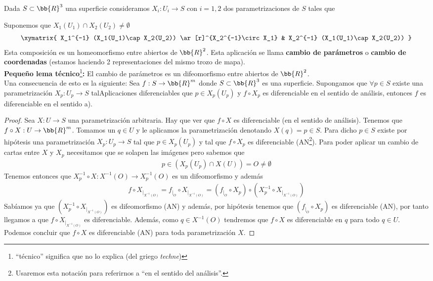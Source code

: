 \begin{ejemplo}
\begin{enumerate}
        Dada $S\subset \bb{R}^3$ una superficie consideramos $X_i:U_i\to S$ con $i=1,2$ dos parametrizaciones de $S$ tales que 

        Suponemos que $X_1(U_1)\cap X_2(U_2) \neq \emptyset$
        \begin{gather*}
            \xymatrix{
                X_1^{-1} (X_1(U_1)\cap X_2(U_2)) \ar[r]^{X_2^{-1}\circ X_1} & X_2^{-1} (X_1(U_1)\cap X_2(U_2))
            }
        \end{gather*}
        Esta composición es un homeomorfismo entre abiertos de $\bb{R}^2$. Esta aplicación se llama \textbf{cambio de parámetros} o \textbf{cambio de coordenadas} (estamos haciendo 2 representaciones del mismo trozo de mapa). \\

        \textbf{Pequeño lema técnico}\footnote{``técnico'' significa que no lo explica (del griego \textit{techne})}\textbf{:} El cambio de parámetros es un difeomorfismo entre abiertos de $\bb{R}^2$.\\

        Una consecuencia de esto es la siguiente: Sea $f:S\to \bb{R}^m$ donde $S \subset \bb{R}^3$ es una superficie. Supongamos que $\forall p \in S$ existe una parametrización $X_p:U_p\to S$ talAplicaciones diferenciables que $p\in X_p(U_p)$ y $f\circ X_p$ es diferenciable en el sentido de análisis, entonces $f$ es diferenciable en el sentido a).
        \begin{proof}
            Sea $X:U\to S$ una parametrización arbitraria. Hay que ver que $f\circ X$ es diferenciable (en el sentido de análisis). Tenemos que $f\circ X : U \to \bb{R}^m$. Tomamos un $q\in U$ y le aplicamos la parametrización denotando $X(q)=p\in S$. Para dicho $p\in S$ existe por hipótesis una parametrización $X_p:U_p\to S$ tal que $p\in X_p(U_p)$ y tal que $f\circ X_p$ es diferenciable (AN\footnote{Usaremos esta notación para referirnos a ``en el sentido del análisis''.}). Para poder aplicar un cambio de cartas entre $X$ y $X_p$ necesitamos que se solapen las imágenes pero sabemos que 
            \begin{gather*}
                p\in (X_p(U_p)\cap X(U))=O \neq \emptyset
            \end{gather*}
            Tenemos entonces que $X_p^{-1}\circ X: X^{-1}(O)\to X_p^{-1}(O)$ es un difeomorfismo y además
            \begin{gather*}
                f\circ X_{|_{X^{-1}(O)}} = f_{|_O}\circ X_{|_{X^{-1}(O)}} = (f_{|_O}\circ X_p) \circ (X_p^{-1} \circ X_{|_{X^{-1}(O)}})
            \end{gather*}
            Sabíamos ya que $(X_p^{-1} \circ X_{|_{X^{-1}(O)}})$ es difeomorfismo (AN) y además, por hipótesis tenemos que $(f_{|_O}\circ X_p)$ es diferenciable (AN), por tanto llegamos a que $f\circ X_{|_{X^{-1}(O)}}$ es diferenciable. Además, como $q\in X^{-1}(O)$ tendremos que $f\circ X$ es diferenciable en $q$ para todo $q\in U$. Podemos concluir que $f\circ X$ es diferenciable (AN) para toda parametrización $X$.
        \end{proof}


\end{enumerate}
\end{ejemplo}
